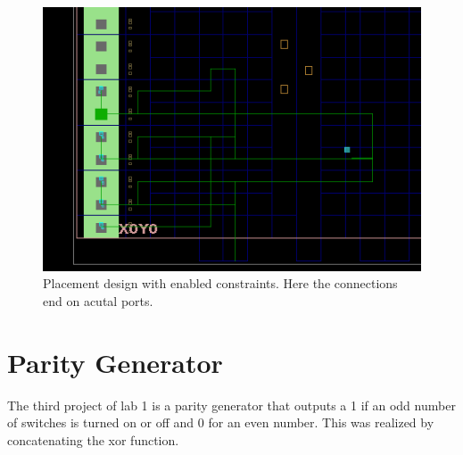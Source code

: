 \begin{figure}
	\centering
	\includegraphics[width=.8\linewidth]{./L1/E2/with_constrains}
	\caption{Placement design with enabled constraints. Here the connections end on acutal ports.}
	\label{fig: placement with constraints e_1_2_5}
\end{figure}



\section{Parity Generator}

The third project of lab 1 is a parity generator that outputs a 1 if an odd number of switches is turned on or off and 0 for an even number. This was realized by concatenating the xor function.

